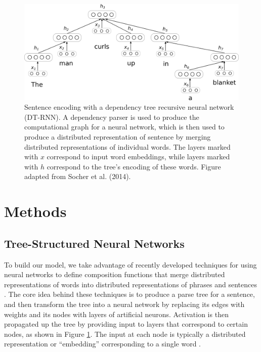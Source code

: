 \documentclass[utf8]{frontiersSCNS} %
\begin{document}
\begin{figure}[t]
\begin{center}
\includegraphics[width=5in]{figures/depnet.png}
\end{center}
\caption{Sentence encoding with a dependency tree recursive neural network (DT-RNN). A dependency parser is used to produce the computational graph for a neural network, which is then used to produce a distributed representation of sentence by merging distributed representations of individual words. The layers marked with $x$ correspond to input word embeddings, while layers marked with $h$ correspond to the tree's encoding of these words. Figure adapted from Socher et al. (2014).} 
\label{depnet}
\end{figure}

\section{Methods}

\subsection{Tree-Structured Neural Networks}

To build our model, we take advantage of recently developed techniques for using neural networks to define composition functions that merge distributed representations of words into distributed representations of phrases and sentences \citep{Socher:2012,Socher:2014}. The core idea behind these techniques is to produce a parse tree for a sentence, and then transform the tree into a neural network by replacing its edges with weights and its nodes with layers of artificial neurons. Activation is then propagated up the tree by providing input to layers that correspond to certain nodes, as shown in Figure \ref{depnet}. The input at each node is typically a distributed representation or ``embedding'' corresponding to a single word \citep[see e.g.,][]{Mikolov:2013,TurneyPantel:2010,LandauerDumais:1997,JonesMewhort:2007}. 
\end{document}
